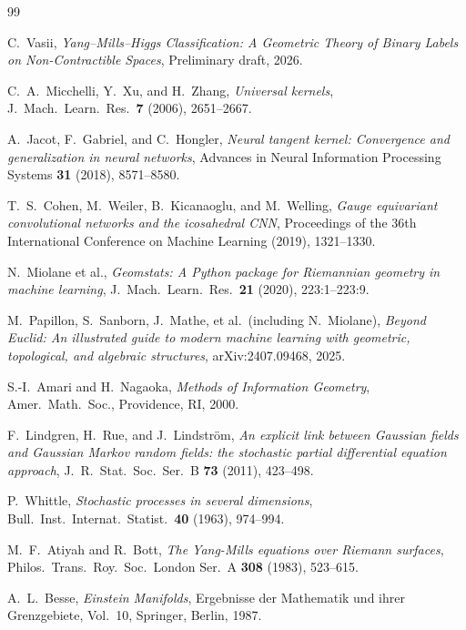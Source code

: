 \documentclass[11pt, a4paper]{article}
\theoremstyle{plain}
\theoremstyle{definition}
\begin{document}
\begin{thebibliography}{99}

C.~Vasii,
\textit{Yang--Mills--Higgs Classification: A Geometric Theory of Binary Labels
on Non-Contractible Spaces},
Preliminary draft, 2026.

C.~A.~Micchelli, Y.~Xu, and H.~Zhang,
\textit{Universal kernels},
J.\ Mach.\ Learn.\ Res.\ \textbf{7} (2006), 2651--2667.

A.~Jacot, F.~Gabriel, and C.~Hongler,
\textit{Neural tangent kernel: Convergence and generalization in neural networks},
Advances in Neural Information Processing Systems \textbf{31} (2018), 8571--8580.

T.~S.~Cohen, M.~Weiler, B.~Kicanaoglu, and M.~Welling,
\textit{Gauge equivariant convolutional networks and the icosahedral CNN},
Proceedings of the 36th International Conference on Machine Learning (2019), 1321--1330.

N.~Miolane et al.,
\textit{Geomstats: A Python package for Riemannian geometry in machine learning},
J.\ Mach.\ Learn.\ Res.\ \textbf{21} (2020), 223:1--223:9.

M.~Papillon, S.~Sanborn, J.~Mathe, et al.\ (including N.~Miolane),
\textit{Beyond Euclid: An illustrated guide to modern machine learning with geometric,
topological, and algebraic structures},
arXiv:2407.09468, 2025.

S.-I.~Amari and H.~Nagaoka,
\textit{Methods of Information Geometry},
Amer.\ Math.\ Soc., Providence, RI, 2000.

F.~Lindgren, H.~Rue, and J.~Lindstr\"{o}m,
\textit{An explicit link between Gaussian fields and Gaussian Markov random fields:
the stochastic partial differential equation approach},
J.\ R.\ Stat.\ Soc.\ Ser.\ B \textbf{73} (2011), 423--498.

P.~Whittle,
\textit{Stochastic processes in several dimensions},
Bull.\ Inst.\ Internat.\ Statist.\ \textbf{40} (1963), 974--994.

M.~F.~Atiyah and R.~Bott,
\textit{The Yang-Mills equations over Riemann surfaces},
Philos.\ Trans.\ Roy.\ Soc.\ London Ser.~A \textbf{308} (1983), 523--615.

A.~L.~Besse,
\textit{Einstein Manifolds},
Ergebnisse der Mathematik und ihrer Grenzgebiete, Vol.~10,
Springer, Berlin, 1987.


\end{thebibliography}
\end{document}

